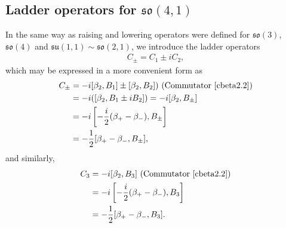 \documentclass[12pt,a4paper]{report}
\theoremstyle{definition}
\theoremstyle{remark}
\theoremstyle{remark}
\begin{document}
\subsection{Ladder operators for $\mathfrak{so}(4,1)$}
In the same way as raising and lowering operators were defined for $\mathfrak{so}(3)$,$\mathfrak{so}(4)$ and $\mathfrak{su}(1,1)\sim\mathfrak{so}(2,1)$, we introduce the ladder operators
\begin{align*}
C_\pm=C_1\pm iC_2,
\end{align*}
which may be expressed in a more convenient form as
\begin{align*}
C_\pm&=-i[\beta_2,B_1]\pm [\beta_2,B_2]) \text{ (Commutator~\ref{cbeta2.2})}\\
&= -i([\beta_2,B_1\pm iB_2])=-i[\beta_2,B_\pm]\\
&=-i\left[-\frac{i}{2}(\beta_+-\beta_-),B_\pm\right]\\
&=-\frac{1}{2}[\beta_+-\beta_-,B_\pm],
\end{align*}
and similarly,
\begin{align*}
C_3&=-i[\beta_2,B_3]\text{ (Commutator~\ref{cbeta2.2})}\\
&=-i\left[-\frac{i}{2}(\beta_+-\beta_-),B_3\right]
\\
&=-\frac{1}{2}[\beta_+-\beta_-,B_3].
\end{align*}
\end{document}
